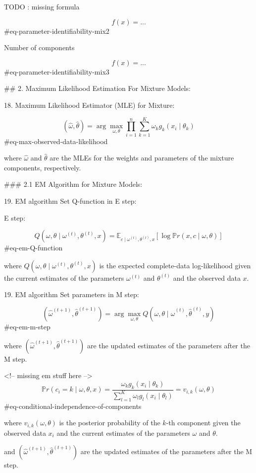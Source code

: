 TODO : missing formula

$$
f(x) = ...
$$ {#eq-parameter-identifiability-mix2}

Number of components

$$
f(x) = ...
$$ {#eq-parameter-identifiability-mix3}


## 2. Maximum Likelihood Estimation For Mixture Models:

18. Maximum Likelihood Estimator (MLE) for Mixture:


$$
(\hat{\omega}, \hat{\theta}) = \arg\max_{\omega, \theta} \prod_{i=1}^n \sum_{k=1}^K \omega_k g_k(x_i \mid \theta_k)
$$ {#eq-max-observed-data-likelihood}

where $\hat{\omega}$ and $\hat{\theta}$ are the MLEs for the weights and parameters of the mixture components, respectively.

### 2.1 EM Algorithm for Mixture Models:

19. EM algorithm Set Q-function in E step:

E step:

$$
Q(\omega, \theta \mid \omega^{(t)}, \theta^{(t)}, x) = \mathbb{E}_{c \mid \omega^{(t)}, \theta^{(t)}, x} [\log \mathbb{P}r(x, c \mid \omega, \theta)]
$$ {#eq-em-Q-function}


where $Q(\omega, \theta \mid \omega^{(t)}, \theta^{(t)}, x)$ is the expected complete-data log-likelihood given the current estimates of the parameters $\omega^{(t)}$ and $\theta^{(t)}$ and the observed data $x$.

19. EM algorithm Set parameters in M step:

$$
(\hat{\omega}^{(t+1)}, \hat{\theta}^{(t+1)}) = \arg\max_{\omega, \theta} Q(\omega, \theta \mid \hat{\omega}^{(t)}, \hat{\theta}^{(t)}, y)   
$$ {#eq-em-m-step}

where $(\hat{\omega}^{(t+1)}, \hat{\theta}^{(t+1)})$ are the updated estimates of the parameters after the M step.

<!-- missing em stuff here -->
$$
\mathbb{P}r(c_i = k \mid \omega, \theta, x) = \frac{\omega_k g_k(x_i \mid \theta_k)}{\sum_{l=1}^K \omega_l g_l(x_i \mid \theta_l)} = v_{i,k}(\omega, \theta)
$$ {#eq-conditional-independence-of-components}

where $v_{i,k}(\omega, \theta)$ is the posterior probability of the $k$-th component given the observed data $x_i$ and the current estimates of the parameters $\omega$ and $\theta$.

and $(\hat{\omega}^{(t+1)}, \hat{\theta}^{(t+1)})$ are the updated estimates of the parameters after the M step.

